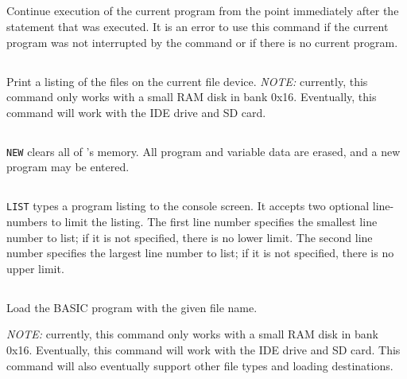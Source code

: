 \documentclass{report}
\begin{document}
    \subsection*{}

    Continue execution of the current program from the point immediately after the  statement that was executed.
    It is an error to use this command if the current program was not interrupted by the  command or if there
    is no current program.

    \subsection*{}

    Print a listing of the files on the current file device. {\em NOTE:} currently, this command only works with a small
    RAM disk in bank 0x16. Eventually, this command will work with the IDE drive and SD card.

    \subsection*{}

    \verb+NEW+ clears all of \BASIC's memory. All program and variable data are erased, and a new program may be entered.

    \subsection*{}

    \verb+LIST+ types a program listing to the console screen. It accepts two optional line-numbers to limit the listing.
    The first line number specifies the smallest line number to list; if it is not specified, there is no lower limit.
    The second line number specifies the largest line number to list; if it is not specified, there is no upper limit.

    \subsection*{ }

    Load the BASIC program with the given file name.
    
    {\em NOTE:} currently, this command only works with a small
    RAM disk in bank 0x16. Eventually, this command will work with the IDE drive and SD card.
    This command will also eventually support other file types and loading destinations.
\end{document}

